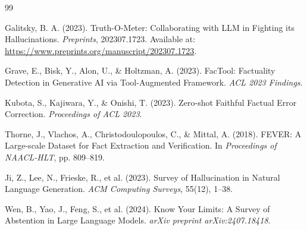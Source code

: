 \documentclass[11pt,a4paper]{article}
\begin{document}
\begin{thebibliography}{99}

Galitsky, B. A. (2023).
Truth-O-Meter: Collaborating with LLM in Fighting its Hallucinations.
\textit{Preprints}, 202307.1723.
Available at: \url{https://www.preprints.org/manuscript/202307.1723}.

Grave, E., Bisk, Y., Alon, U., \& Holtzman, A. (2023).
FacTool: Factuality Detection in Generative AI via Tool-Augmented Framework.
\textit{ACL 2023 Findings}.

Kubota, S., Kajiwara, Y., \& Onishi, T. (2023).
Zero-shot Faithful Factual Error Correction.
\textit{Proceedings of ACL 2023}.

Thorne, J., Vlachos, A., Christodoulopoulos, C., \& Mittal, A. (2018).
FEVER: A Large-scale Dataset for Fact Extraction and Verification.
In \textit{Proceedings of NAACL-HLT}, pp. 809--819.

Ji, Z., Lee, N., Frieske, R., et al. (2023).
Survey of Hallucination in Natural Language Generation.
\textit{ACM Computing Surveys}, 55(12), 1--38.

Wen, B., Yao, J., Feng, S., et al. (2024).
Know Your Limits: A Survey of Abstention in Large Language Models.
\textit{arXiv preprint arXiv:2407.18418}.

\end{thebibliography}
\end{document}
